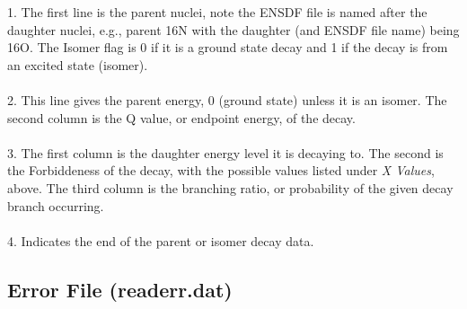 \documentclass{report}
\begin{document}

1. The first line is the parent nuclei, note the ENSDF file is named after the daughter nuclei, e.g., parent 16N with the daughter
 (and ENSDF file name) being 16O. The Isomer flag is 0 if it is a ground state decay and 1 if
the decay is from an excited state (isomer).\\ \\
2. This line gives the parent energy, 0 (ground state) unless it is an isomer. The second column is the Q value, or endpoint 
energy, of the decay.\\ \\
3. The first column is the daughter energy level it is decaying to. The second is the Forbiddeness of 
the decay, with the possible values listed under \textit{X Values}, above. The third column is the 
branching ratio, or probability of the given decay branch occurring.  \\ \\
4. Indicates the end of the parent or isomer decay data. 

\subsection{Error File (readerr.dat)}
\end{document}
